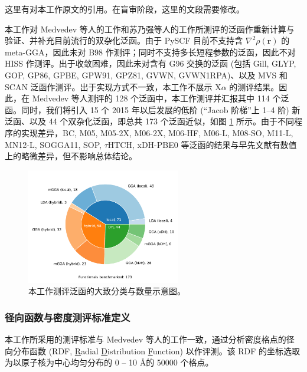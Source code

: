 \alert{这里有对本工作原文的引用。在盲审阶段，这里的文段需要修改。}

本工作对 Medvedev 等人的工作\cite{Medvedev-Lyssenko.S.2017}和苏乃强等人的工作\cite{Su-Xu.PNAS.2018}所测评的泛函作重新计算与验证、并补充目前流行的双杂化泛函。由于 PySCF 目前不支持含 $\nabla^2 \rho(\bm{r})$ 的 meta-GGA，因此未对 B98 作测评；同时不支持多长短程参数的泛函，因此不对 HISS 作测评。出于收敛困难，因此未对含有 G96 交换的泛函 (包括 Gill, GLYP, GOP, GP86, GPBE, GPW91, GPZ81, GVWN, GVWN1RPA)、以及 MVS 和 SCAN 泛函作测评。出于实现方式不一致，本工作不展示 X$\alpha$ 的测评结果。因此，在 Medvedev 等人测评的 128 个泛函中，本工作测评并汇报其中 114 个泛函。同时，我们将引入 15 个 2015 年以后发展的低阶 (“Jacob 阶梯”上 1--4 阶) 新泛函、以及 44 个双杂化泛函，即总共 173 个泛函近似，如图 \ref{fig.functionals-distribution} 所示。由于不同程序的实现差异，BC, M05, M05-2X, M06-2X, M06-HF, M06-L, M08-SO, M11-L, MN12-L, SOGGA11, SOP, $\tau$HTCH, xDH-PBE0 等泛函的结果与早先文献有数值上的略微差异，但不影响总体结论。

\begin{figure}[hp]
    \centering
    \caption{本工作测评泛函的大致分类与数量示意图。}
    \label{fig.functionals-distribution}
    \includegraphics[width=0.6\textwidth]{assets/functionals-distribution.pdf}
\end{figure}

\subsubsection{径向函数与密度测评标准定义}

本工作所采用的测评标准与 Medvedev 等人的工作\cite{Medvedev-Lyssenko.S.2017}一致，通过分析密度格点的径向分布函数 (RDF, \underline{R}adial \underline{D}istribution \underline{F}unction) 以作评测。该 RDF 的坐标选取为以原子核为中心均匀分布的 0 -- 10 \AA 的 50000 个格点。

